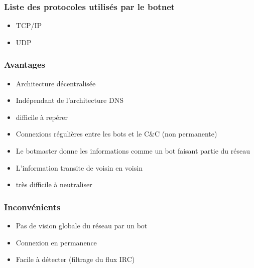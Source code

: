 \subsubsection{Liste des protocoles utilisés par le botnet}
\begin{itemize}
	\item TCP/IP
	\item UDP
\end{itemize}

\subsubsection{Avantages}
\begin{itemize}
	\item Architecture décentralisée
	\item Indépendant de l’architecture DNS
	\item difficile à repérer
	\item Connexions régulières entre les bots et le C\&C (non permanente)
	\item Le botmaster donne les informations comme un bot faisant partie du réseau
  \item L’information transite de voisin en voisin
	\item très difficile à neutraliser
\end{itemize}

\subsubsection{Inconvénients}
\begin{itemize}
	\item Pas de vision globale du réseau par un bot
	\item Connexion en permanence
	\item Facile à détecter (filtrage du flux IRC)
\end{itemize}



